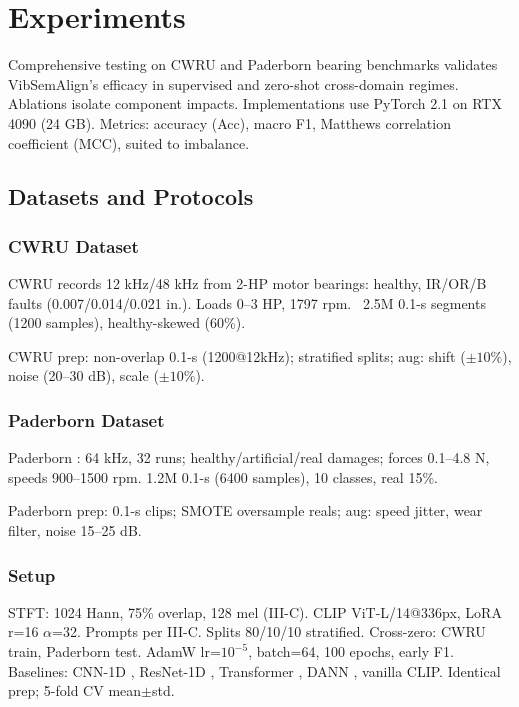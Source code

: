 \section{Experiments}

Comprehensive testing on CWRU and Paderborn bearing benchmarks validates VibSemAlign's efficacy in supervised and zero-shot cross-domain regimes. Ablations isolate component impacts. Implementations use PyTorch 2.1 on RTX 4090 (24 GB). Metrics: accuracy (Acc), macro F1, Matthews correlation coefficient (MCC), suited to imbalance.

\subsection{Datasets and Protocols}

\subsubsection{CWRU Dataset}
CWRU \cite{casewestern2010} records 12 kHz/48 kHz from 2-HP motor bearings: healthy, IR/OR/B faults (0.007/0.014/0.021 in.). Loads 0--3 HP, 1797 rpm. ~2.5M 0.1-s segments (1200 samples), healthy-skewed (60\%).

CWRU prep: non-overlap 0.1-s (1200@12kHz); stratified splits; aug: shift ($\pm10\%$), noise (20--30 dB), scale ($\pm10\%$).

\subsubsection{Paderborn Dataset}
Paderborn \cite{paderborn2014}: 64 kHz, 32 runs; healthy/artificial/real damages; forces 0.1--4.8 N, speeds 900--1500 rpm. 1.2M 0.1-s (6400 samples), 10 classes, real 15\%.

Paderborn prep: 0.1-s clips; SMOTE oversample reals; aug: speed jitter, wear filter, noise 15--25 dB.

\subsubsection{Setup}
STFT: 1024 Hann, 75\% overlap, 128 mel (III-C). CLIP ViT-L/14@336px, LoRA r=16 $\alpha$=32. Prompts per III-C. Splits 80/10/10 stratified. Cross-zero: CWRU train, Paderborn test. AdamW lr=$10^{-5}$, batch=64, 100 epochs, early F1. Baselines: CNN-1D \cite{wen2019convolutional}, ResNet-1D \cite{he2016deep}, Transformer \cite{vaswani2017attention}, DANN \cite{ganin2016domain}, vanilla CLIP. Identical prep; 5-fold CV mean$\pm$std.

